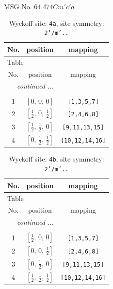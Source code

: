 \documentclass[fleqn,8pt]{jsarticle}
\begin{document}
\setcounter{MaxMatrixCols}{32}

\renewcommand{\tablename}{Table~}
\renewcommand{\figurename}{Figure~}
\begin{center}
\LARGE
MSG No. 64.474\quad$Cm'c'a$
\end{center}
\renewcommand{\arraystretch}{1.2}
\begin{longtable}{ccc}
\caption{Wyckoff site: {\tt 4a}, site symmetry: {\tt 2'/m'..}}
 \\
 \hline \hline
No. & position & mapping \\ \hline \endfirsthead

\multicolumn{2}{l}{\tablename\ \thetable{}} \\
 \hline \hline
No. & position & mapping \\ \hline \endhead

 \hline \hline
\multicolumn{2}{r}{\footnotesize\it continued ...} \\ \endfoot

 \hline \hline
\multicolumn{2}{r}{} \\ \endlastfoot

1 & $\left[ 0,\, 0,\, 0 \right]$ & {\tt [1,3,5,7]} \\ \hline
2 & $\left[ \frac{1}{2},\, 0,\, \frac{1}{2} \right]$ & {\tt [2,4,6,8]} \\ \hline
3 & $\left[ \frac{1}{2},\, \frac{1}{2},\, 0 \right]$ & {\tt [9,11,13,15]} \\ \hline
4 & $\left[ 0,\, \frac{1}{2},\, \frac{1}{2} \right]$ & {\tt [10,12,14,16]} \\
\end{longtable}
\renewcommand{\arraystretch}{1.2}
\begin{longtable}{ccc}
\caption{Wyckoff site: {\tt 4b}, site symmetry: {\tt 2'/m'..}}
 \\
 \hline \hline
No. & position & mapping \\ \hline \endfirsthead

\multicolumn{2}{l}{\tablename\ \thetable{}} \\
 \hline \hline
No. & position & mapping \\ \hline \endhead

 \hline \hline
\multicolumn{2}{r}{\footnotesize\it continued ...} \\ \endfoot

 \hline \hline
\multicolumn{2}{r}{} \\ \endlastfoot

1 & $\left[ \frac{1}{2},\, 0,\, 0 \right]$ & {\tt [1,3,5,7]} \\ \hline
2 & $\left[ 0,\, 0,\, \frac{1}{2} \right]$ & {\tt [2,4,6,8]} \\ \hline
3 & $\left[ 0,\, \frac{1}{2},\, 0 \right]$ & {\tt [9,11,13,15]} \\ \hline
4 & $\left[ \frac{1}{2},\, \frac{1}{2},\, \frac{1}{2} \right]$ & {\tt [10,12,14,16]} \\
\end{longtable}
\end{document}
